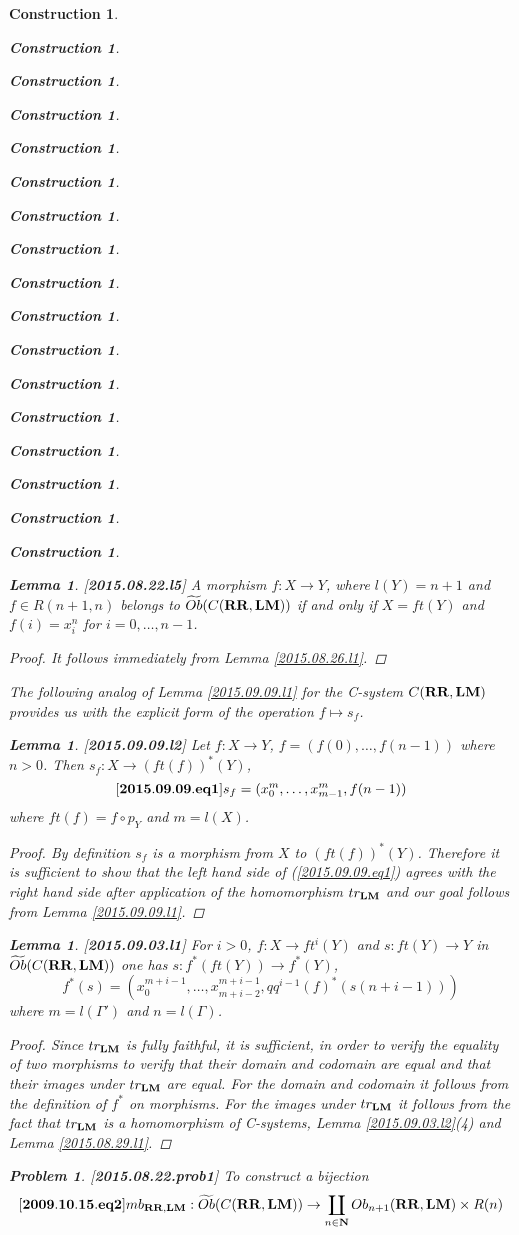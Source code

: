 \documentclass[12pt]{amsart}
\newenvironment{eq}{\begin{equation}}{\end{equation}}
\newtheorem{lemma}[proposition]{Lemma}
\newtheorem{problem}[proposition]{Problem}
\newtheorem{construction}[proposition]{Construction}
\newcommand{\llabel}[1]{\label{#1}[{\bf #1}]}
\newcommand{\sr}{\rightarrow}
\newcommand{\nn}{{\bf N\rm}}
\newcommand{\nat}{\nn}
\newcommand{\wt}{\widetilde}
\newcommand{\mbind}[1]{{#1^*}}
\newcommand{\RR}{{\bf RR}}
\newcommand{\LM}{{\bf LM}}
\begin{document}
\begin{construction}
\begin{construction}
\begin{construction}
\begin{construction}
\begin{construction}
\begin{construction}
\begin{construction}
\begin{construction}
\begin{construction}
\begin{construction}
\begin{construction}
\begin{construction}
\begin{construction}
\begin{construction}
\begin{construction}
\begin{construction}
\begin{construction}
%
\begin{lemma}
\llabel{2015.08.22.l5}
A morphism $f:X\sr Y$, where $l(Y)=n+1$ and $f\in R(n+1,n)$ belongs to $\wt{Ob}(C(\RR,\LM))$ if and only if $X=ft(Y)$ and $f(i)=x^n_i$ for $i=0,\dots,n-1$. 
\end{lemma}
%
\begin{proof}
It follows immediately from Lemma \ref{2015.08.26.l1}.
\end{proof}
%
The following analog of Lemma \ref{2015.09.09.l1} for the C-system $C(\RR,\LM)$ provides us with the explicit form of the operation $f\mapsto s_f$.
%
\begin{lemma}
\llabel{2015.09.09.l2}
Let $f:X\sr Y$, $f=(f(0),\dots,f(n-1))$ where $n>0$. Then $s_f:X\sr (ft(f))^*(Y)$,
%
\begin{eq}\llabel{2015.09.09.eq1}
s_f=(x_0^{m},\dots,x_{m-1}^{m},f(n-1))
\end{eq}
%
where $ft(f)=f\circ p_Y$ and $m=l(X)$. 
\end{lemma}
%
\begin{proof}
By definition $s_f$ is a morphism from $X$ to $(ft(f))^*(Y)$. Therefore it is sufficient to show that the left hand side of (\ref{2015.09.09.eq1}) agrees with the right hand side after application of the homomorphism $tr_{\LM}$ and our goal follows from Lemma \ref{2015.09.09.l1}.
\end{proof}
%
\begin{lemma}
\llabel{2015.09.03.l1}
For $i>0$, $f:X\sr ft^i(Y)$ and $s:ft(Y)\sr Y$ in $\wt{Ob}(C(\RR,\LM))$ one has $s:f^*(ft(Y))\sr f^*(Y)$,
%
$$f^*(s)=(x_0^{m+i-1},\dots,x_{m+i-2}^{m+i-1},\mbind{qq^{i-1}(f)}(s(n+i-1)))$$
%
where $m=l(\Gamma')$ and $n=l(\Gamma)$.
\end{lemma}
%
\begin{proof}
Since $tr_{\LM}$ is fully faithful, it is sufficient, in order to verify the equality of two morphisms to verify that their domain and codomain are equal and that their images under $tr_{\LM}$ are equal. For the domain and codomain it follows from the definition of $f^*$ on morphisms. For the images under $tr_{\LM}$ it follows from the fact that $tr_{\LM}$ is a homomorphism of C-systems, Lemma \ref{2015.09.03.l2}(4) and
Lemma \ref{2015.08.29.l1}. 
\end{proof}
%
\begin{problem}
\llabel{2015.08.22.prob1}
To construct a bijection
%
\begin{eq}
\llabel{2009.10.15.eq2}
mb_{\RR,\LM}:\wt{Ob}(C(\RR,\LM))\sr \coprod_{n\in\nat} Ob_{n+1}(\RR,\LM)\times R(n)

\end{eq}
\end{problem}
\end{construction}
\end{construction}
\end{construction}
\end{construction}
\end{construction}
\end{construction}
\end{construction}
\end{construction}
\end{construction}
\end{construction}
\end{construction}
\end{construction}
\end{construction}
\end{construction}
\end{construction}
\end{construction}
\end{construction}
\end{document}

